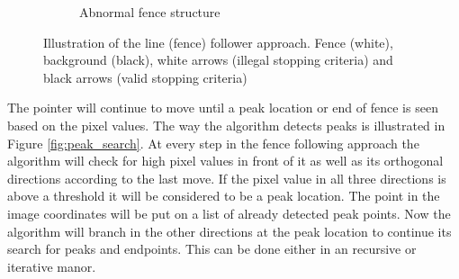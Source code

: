 \documentclass[../Head/Main.tex]{subfiles}
\begin{document}
\begin{figure}[H]
\begin{subfigure}{.245\textwidth}
        \caption{Abnormal fence structure}
        \label{fig:abnormal_fence_strcuture}
    \end{subfigure}
    \caption{Illustration of the line (fence) follower approach. Fence (white), background (black), white arrows (illegal stopping criteria) and black arrows (valid stopping criteria)}
    \label{fig:line_search}
\end{figure}

\clearpage
The pointer will continue to move until a peak location or end of fence is seen based on the pixel values. The way the algorithm detects peaks is illustrated in Figure \ref{fig:peak_search}. At every step in the fence following approach the algorithm will check for high pixel values in front of it as well as its orthogonal directions according to the last move. If the pixel value in all three directions is above a threshold it will be considered to be a peak location. The point in the image coordinates will be put on a list of already detected peak points. Now the algorithm will branch in the other directions at the peak location to continue its search for peaks and endpoints. This can be done either in an recursive or iterative manor.    
\end{document}
